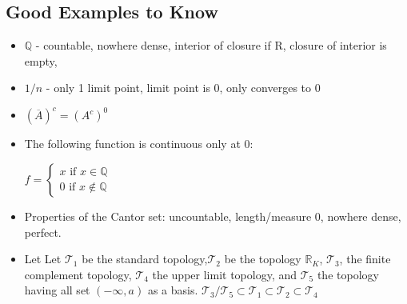\documentclass[8pt,reqno,twocolumn]{amsart}
\theoremstyle{definition}
\newcommand{\R}{\mathbb{R}}
\newcommand{\Q}{\mathbb{Q}}
\renewcommand{\tt}{\mathcal{T}}
\begin{document}
\subsection*{Good Examples to Know}
\begin{itemize}
    \item $\Q$ - countable, nowhere dense, interior of closure if R, closure of interior is empty, 
    \item $1/n$ - only 1 limit point, limit point is 0, only converges to 0
    \item $(\overline{A})^c = (A^c)^0$
    \item The following function is continuous only at 0:

    $f = \begin{cases}
        x \text{ if } x \in \Q \\
        0 \text{ if } x \notin \Q
    \end{cases}$

    \item Properties of the Cantor set: uncountable, length/measure 0, nowhere dense, perfect.
    \item Let Let $\tt_1$ be the standard topology,$\tt_2$ be the topology $\R_K$, $\tt_3$, the finite complement topology, $\tt_4$ the upper limit topology, and $\tt_5$ the topology having all set $(-\infty,a)$ as a basis.
    $\tt_3/\tt_5 \subset \tt_1 \subset \tt_2 \subset \tt_4$
\end{itemize}
\end{document}
